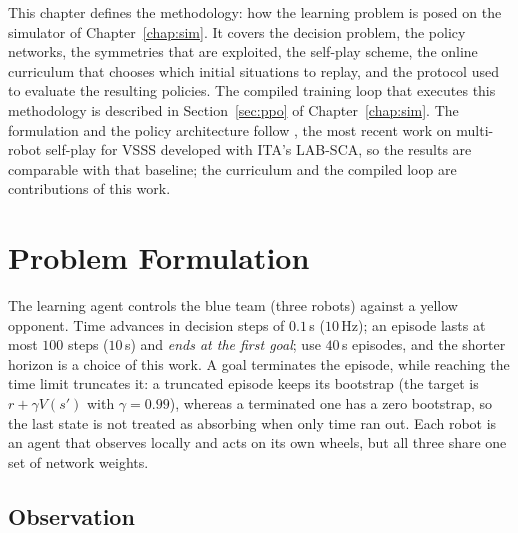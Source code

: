 
This chapter defines the methodology: how the learning problem is posed on the simulator of
Chapter~\ref{chap:sim}.  It covers the decision problem, the policy networks, the symmetries that are exploited,
the self-play scheme, the online curriculum that chooses which initial situations to replay, and the protocol used to
evaluate the resulting policies.  The compiled training loop that executes this methodology is described in Section~\ref{sec:ppo}
of Chapter~\ref{chap:sim}.  The formulation and the policy
architecture follow \textcite{brandao2022}, the most recent
work on multi-robot self-play for VSSS developed with ITA's LAB-SCA, so the results are comparable
with that baseline; the curriculum and the compiled loop are
contributions of this work.

\section{Problem Formulation}
\label{sec:formulation}

The learning agent controls the blue team (three robots) against a yellow opponent.
Time advances in decision steps of $0.1$\,s ($10$\,Hz); an episode lasts at most
$100$ steps ($10$\,s) and \emph{ends at the first goal}; \textcite{brandao2022} use $40$\,s episodes, and the shorter horizon is a choice of this work.  A goal
terminates the episode, while reaching the time limit truncates it: a truncated episode keeps its bootstrap
(the target is $r+\gamma V(s')$ with $\gamma=0.99$), whereas a terminated one has a zero bootstrap, so the last state is not treated as absorbing when only time ran out.  Each robot is an agent that observes locally and acts on its
own wheels, but all three share one set of network weights.

\subsection{Observation}

